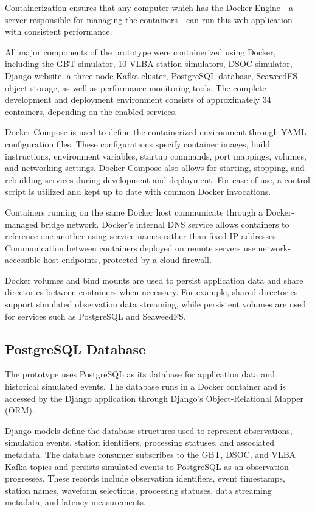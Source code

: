 \documentclass[12pt]{article}
\begin{document}
Containerization ensures that any computer which has the Docker Engine - a server responsible for managing the containers - can run this web application with consistent performance.

All major components of the prototype were containerized using Docker, including the GBT simulator, 10 VLBA station simulators, DSOC simulator, Django website, a three-node Kafka cluster, PostgreSQL database, SeaweedFS object storage, as well as performance monitoring tools. The complete development and deployment environment consists of approximately 34 containers, depending on the enabled services.

Docker Compose is used to define the containerized environment through YAML configuration files. These configurations specify container images, build instructions, environment variables, startup commands, port mappings, volumes, and networking settings. Docker Compose also allows for starting, stopping, and rebuilding services during development and deployment. For ease of use, a control script is utilized and kept up to date with common Docker invocations.

Containers running on the same Docker host communicate through a Docker-managed bridge network. Docker's internal DNS service allows containers to reference one another using service names rather than fixed IP addresses. Communication between containers deployed on remote servers use network-accessible host endpoints, protected by a cloud firewall.

Docker volumes and bind mounts are used to persist application data and share directories between containers when necessary. For example, shared directories support simulated observation data streaming, while persistent volumes are used for services such as PostgreSQL and SeaweedFS.

\subsection*{PostgreSQL Database}
The prototype uses PostgreSQL as its database for application data and historical simulated events. The database runs in a Docker container and is accessed by the Django application through Django's Object-Relational Mapper (ORM).

Django models define the database structures used to represent observations, simulation events, station identifiers, processing statuses, and associated metadata. The database consumer subscribes to the GBT, DSOC, and VLBA Kafka topics and persists simulated events to PostgreSQL as an observation progresses. These records include observation identifiers, event timestamps, station names, waveform selections, processing statuses, data streaming metadata, and latency measurements.
\end{document}
